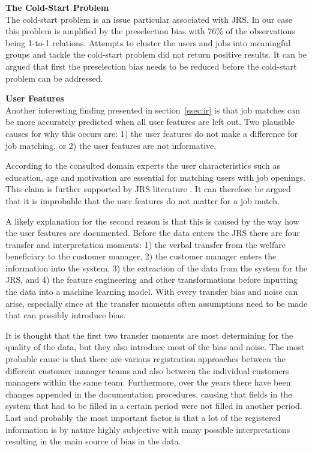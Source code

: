 \noindent
\textbf{The Cold-Start Problem}\\
The cold-start problem is an issue particular associated with JRS. In our case this problem is amplified by the preselection bias with 76\% of the observations being 1-to-1 relations.
Attempts to cluster the users and jobs into meaningful groups and tackle the cold-start problem did not return positive results.
It can be argued that first the preselection bias needs to be reduced before the cold-start problem can be addressed. 

\noindent
\textbf{User Features}\\
Another interesting finding presented in section~\ref{ssec:ir} is that job matches can be more accurately predicted when all user features are left out.  
Two plausible causes for why this occurs are: 1) the user features do not make a difference for job matching, or 2) the user features are not informative.

According to the consulted domain experts the user characteristics such as education, age and motivation are essential for matching users with job openings. 
This claim is further supported by JRS literature \cite{kenthapadi2017personalized, T.Al-Otaibi2012ASystems, Zheng2012JobSurvey, hong2013job}.
It can therefore be argued that it is improbable that the user features do not matter for a job match. 

A likely explanation for the second reason is that this is caused by the way how the user features are documented.
Before the data enters the JRS there are four transfer and interpretation moments: 1) the verbal transfer from the welfare beneficiary to the customer manager, 2) the customer manager enters the information into the system, 3) the extraction of the data from the system for the JRS, and 4) the feature engineering and other transformations before inputting the data into a machine learning model.
With every transfer bias and noise can arise, especially since at the transfer moments often assumptions need to be made that can possibly introduce bias.

It is thought that the first two transfer moments are most determining for the quality of the data, but they also introduce most of the bias and noise. 
The most probable cause is that there are various registration approaches between the different customer manager teams and also between the individual customers managers within the same team. 
Furthermore, over the years there have been changes appended in the documentation procedures, causing that fields in the system that had to be filled in a certain period were not filled  in another period.
Last and probably the most important factor is that a lot of the registered information is by nature highly subjective with many possible interpretations resulting in the main source of bias in the data. 

